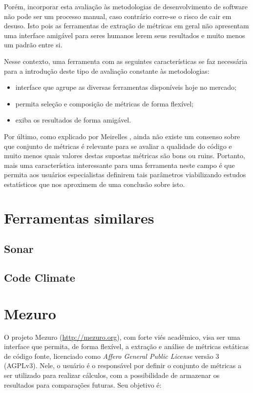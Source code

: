 \documentclass[12pt]{article}
\begin{document}
Porém, incorporar esta avaliação às metodologias de desenvolvimento de software não pode ser um processo manual, caso contrário corre-se o risco de cair em desuso. Isto pois as ferramentas de extração de métricas em geral não apresentam uma interface amigável para seres humanos lerem seus resultados e muito menos um padrão entre si.

Nesse contexto, uma ferramenta com as seguintes características se faz necessária para a introdução deste tipo de avaliação constante às metodologias:

\begin{itemize}
  \item interface que agrupe as diversas ferramentas disponíveis hoje no mercado;
  \item permita seleção e composição de métricas de forma flexível;
  \item exiba os resultados de forma amigável.
\end{itemize}

Por último, como explicado por Meirelles \cite{m13}, ainda não existe um consenso sobre que conjunto de métricas é relevante para se avaliar a qualidade do código e muito menos quais valores destas supostas métricas são bons ou ruins. Portanto, mais uma característica interessante para uma ferramenta neste campo é que permita aos usuários especialistas definirem tais parâmetros viabilizando estudos estatísticos que nos aproximem de uma conclusão sobre isto.

\section{Ferramentas similares}

  \subsection{Sonar}

  \subsection{Code Climate}

\section{Mezuro}
O projeto Mezuro (\url{http://mezuro.org}), com forte viés acadêmico, visa ser uma interface que permita, de forma flexível, a extração e análise de métricas estáticas de código fonte, licenciado como \textit{Affero General Public License} versão 3 (AGPLv3). Nele, o usuário é o responsável por definir o conjunto de métricas a ser utilizado para realizar cálculos, com a possibilidade de armazenar os resultados para comparações futuras. Seu objetivo é:
\end{document}
